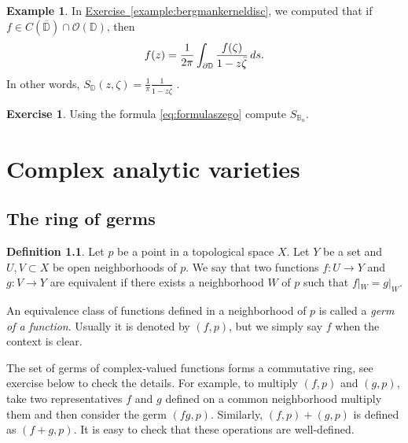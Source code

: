 \documentclass[12pt,openany]{book}
\newcommand{\avoidbreak}{\postdisplaypenalty=100}
\newcommand{\D}{{\mathbb{D}}}
\newcommand{\bB}{{\mathbb{B}}}
\newcommand{\sO}{{\mathscr{O}}}
\newcommand{\myindex}[1]{#1\index{#1}}
\theoremstyle{plain}
\theoremstyle{remark}
\theoremstyle{definition}
\newtheorem{defn}[thm]{Definition}
\newenvironment{exbox}{%
    \def\FrameCommand{\vrule width 1pt \relax\hspace{10pt}}%
    \MakeFramed{\advance\hsize-\width\FrameRestore}%
}{%
    \endMakeFramed
}
\theoremstyle{exercise}
\newtheorem{exercise}{Exercise}[section]
\theoremstyle{example}
\newtheorem{example}[thm]{Example}
\newcommand{\exerciseref}[1]{\hyperref[#1]{Exercise~\ref*{#1}}}
\begin{document}
\begin{example}
In \exerciseref{example:bergmankerneldisc}, we computed that
if $f \in C(\overline{\D}) \cap \sO(\D)$, then
\begin{equation*}
f(z) = \frac{1}{2\pi} \int_{\partial \D} \frac{f(\zeta)}{1-z\bar{\zeta}} \, ds .
\avoidbreak
\end{equation*}
In other words, $S_{\D}(z,\zeta) = 
\frac{1}{\pi}
\frac{1}{1-z\bar{\zeta}}$ .
\end{example}

\begin{exbox}
\begin{exercise}
Using the formula \eqref{eq:formulaszego} compute $S_{\bB_n}$.
\end{exercise}
\end{exbox}


\chapter{Complex analytic varieties} \label{ch:analyticvarieties}


\section{The ring of germs}

\begin{defn}
Let $p$ be a point in a topological space $X$.  Let $Y$ be a set and
$U, V \subset X$ be open neighborhoods of $p$.  We say that
two functions $f \colon U \to Y$ and
$g \colon V \to Y$ are equivalent if there exists a neighborhood
$W$ of $p$ such that $f|_W = g|_W$.

An equivalence class of functions defined in a neighborhood of $p$
is called a \emph{\myindex{germ of a function}}.
%
Usually it is denoted by $(f,p)$, but we simply say $f$ when
the context is clear.
\end{defn}

The set of germs of complex-valued functions forms a
commutative ring, see exercise below to check the details.
For example, to multiply $(f,p)$ and $(g,p)$, take two representatives
$f$ and $g$ defined on a common neighborhood multiply them and
then consider the germ $(fg,p)$.  Similarly, $(f,p) + (g,p)$ is
defined as $(f+g,p)$.  It is easy to check that these operations are
well-defined.
\end{document}
